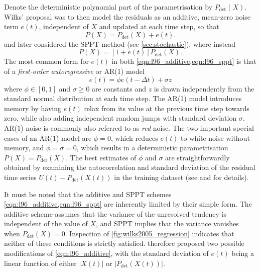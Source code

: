 \documentclass[../main.tex]{subfiles}
\begin{document}
Denote the deterministic polynomial part of the parametrisation by
$P_\mathrm{det}(X)$. Wilks' proposal was to then model the residuals as an
additive, mean-zero noise term $e(t)$, independent of $X$ and updated at each
time step, so that
\begin{equation} \label{eqn:l96_additive}
    P(X) = P_\mathrm{det}(X) + e(t).
\end{equation}
\textcite{arnold2013} and later \textcite{christensen2015} considered the SPPT
method (see \cref{sec:stochastic}), where instead
\begin{equation} \label{eqn:l96_sppt}
    P(X) = [1 + e(t)] P_\mathrm{det}(X).
\end{equation}
The most common form for $e(t)$ in both \cref{eqn:l96_additive,eqn:l96_sppt} is
that of a \emph{first-order autoregressive} or AR(1) model
\begin{equation} \label{eqn:ar1}
    e(t) = \phi e(t - \Delta t) + \sigma z
\end{equation}
where $\phi \in [0,1]$ and $\sigma  \geq 0$ are constants and $z$ is drawn
independently from the standard normal distribution at each time step. The
AR(1) model introduces memory by having $e(t)$ relax from its value at the
previous time step towards zero, while also adding independent random jumps
with standard deviation $\sigma$. AR(1) noise is commonly also referred to as
\emph{red} noise. The two important special cases of an AR(1) model are $\phi =
0$, which reduces $e(t)$ to white noise without memory, and $\phi = \sigma =
0$, which results in a deterministic parametrisation $P(X) =
P_\mathrm{det}(X)$. The best estimates of $\phi$ and $\sigma$ are
straightforwardly obtained by examining the autocorrelation and standard
deviation of the residual time series $U(t) - P_\mathrm{det}(X(t))$ in the
training dataset (see \textcite{arnold2013} and \textcite[Chapter 9]{wilks2011}
for details).

It must be noted that the additive and SPPT schemes
\cref{eqn:l96_additive,eqn:l96_sppt} are inherently limited by their simple
form. The additive scheme assumes that the variance of the unresolved tendency
is independent of the value of $X$, and SPPT implies that the variance vanishes
when $P_\mathrm{det}(X)=0$. Inspection of \cref{fig:wilks2005_regression}
indicates that neither of these conditions is strictly satisfied.
\textcite{arnold2013} therefore proposed two possible modifications of
\cref{eqn:l96_additive}, with the standard deviation of $e(t)$ being a linear
function of either $|X(t)|$ or $|P_\mathrm{det}(X(t))|$.
\end{document}
